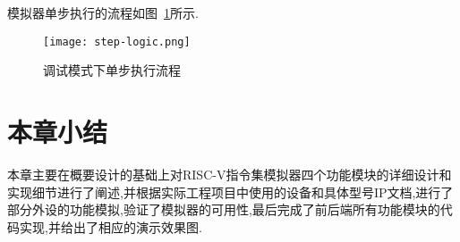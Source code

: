 模拟器单步执行的流程如图~\ref{fig:step}所示.
\begin{figure}[H]
    \centering
    \texttt{[image: step-logic.png]}
    \caption{调试模式下单步执行流程}
    \label{fig:step}
\end{figure}


\section{本章小结}
本章主要在概要设计的基础上对RISC-V指令集模拟器四个功能模块的详细设计和实现细节进行了阐述,并根据实际工程项目中使用的设备和具体型号IP文档,进行了部分外设的功能模拟,验证了模拟器的可用性,最后完成了前后端所有功能模块的代码实现,并给出了相应的演示效果图.


